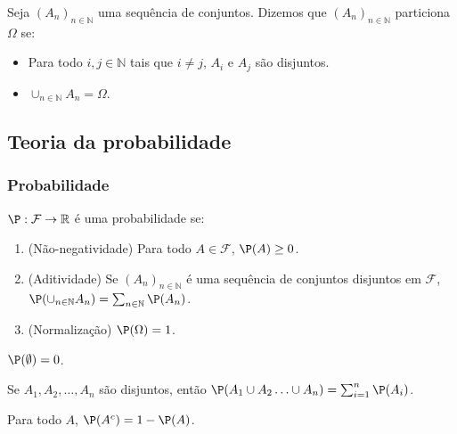   \begin{definition}[Partição]
    \label{partition}
    Seja $(A_{n})_{n \in \mathbb{N}}$ uma sequência de conjuntos. 
		Dizemos que $(A_{n})_{n \in \mathbb{N}}$ particiona $\Omega$ se:
    \begin{itemize}
      \item Para todo $i,j \in \mathbb{N}$ tais que $i \neq j$, $A_{i}$ e $A_{j}$ são disjuntos.
      \item $\cup_{n \in \mathbb{N}}{A_{n}} = \Omega$.
    \end{itemize}
  \end{definition}
  
\subsection{Teoria da probabilidade}

\subsubsection{Probabilidade}

\begin{definition} $\P:\mathcal{F} \rightarrow \mathbb{R}$ é uma probabilidade se: \
 \label{probability}
 \begin{enumerate}
  \item (Não-negatividade) Para todo $A \in \mathcal{F}$, $\P(A) \geq 0$.
  \item (Aditividade) Se $(A_{n})_{n \in \mathbb{N}}$ é uma sequência de conjuntos disjuntos em $\mathcal{F}$, 
			  $\P(\cup_{n \in \mathbb{N}}{A_{n}}) = \sum_{n \in \mathbb{N}}{\P(A_{n})}$.
  \item (Normalização) $\P(\Omega) = 1$.
 \end{enumerate}
\end{definition}
	
\begin{lemma}
 $\P(\emptyset) = 0$.
\end{lemma}
	
\begin{lemma}
 \label{finite_additivity}
 Se $A_{1}, A_{2}, \ldots, A_{n}$ são disjuntos, 
 então $\P(A_{1} \cup A_{2} \ldots \cup A_{n}) = \sum_{i=1}^{n}{\P(A_{i})}$.
\end{lemma}
	
\begin{lemma}
 \label{lemma:complement_probability}
 Para todo $A$, $\P(A^{c}) = 1-\P(A)$.
\end{lemma}

